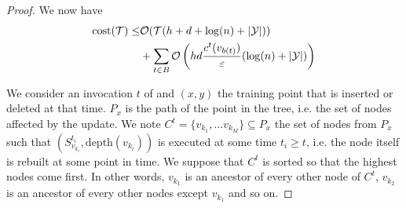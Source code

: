 \begin{proof}
    We now have
    \begin{equation}\label{eq:first_estimate_bound_efficiency}
        \begin{split}
            \text{cost}(\mathcal{T}) \leq &\mathcal{O}(\mathcal{T}(h + d + \log(n) + |\mathcal{Y}|))\\
            & + \sum_{t \in B} \mathcal{O}\left(hd\frac{c^t(v_{b(t)})}{\varepsilon}(\log(n) + |\mathcal{Y}|)\right)
        \end{split}
    \end{equation}

    We consider an invocation $t$ of \AlgoUpdate{} and $(x,y)$ the training point that is inserted or deleted at that time. $P_x$ is the path of the point in the tree, i.e. the set of nodes affected by the update. We note $C^t = \{v_{k_1}, \dots v_{k_M}\} \subseteq P_x$ the set of nodes from $P_x$ such that \AlgoBuild{}$(S^{t_i}_{v_{k_i}}, \text{depth}(v_{k_i}))$ is executed at some time $t_i \geq t$, i.e. the node itself is rebuilt at some point in time. We suppose that $C^t$ is sorted so that the highest nodes come first. In other words, $v_{k_1}$ is an ancestor of every other node of $C^t$, $v_{k_2}$ is an ancestor of every other nodes except $v_{k_1}$ and so on.
    

\end{proof}
